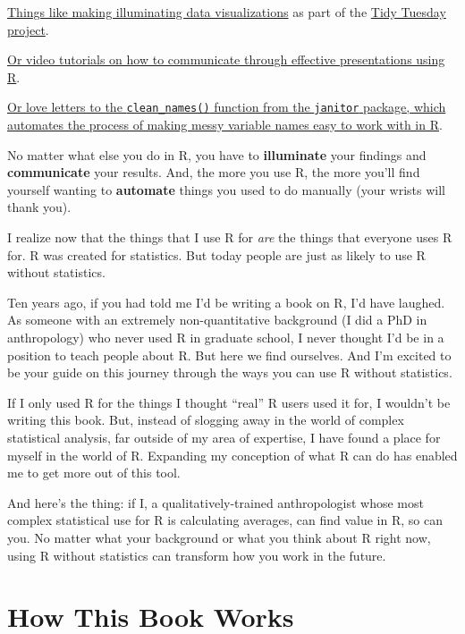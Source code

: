 \documentclass[
]{book}
\begin{document}
\href{https://twitter.com/CedScherer/status/1220843943224578050}{Things like making illuminating data visualizations} as part of the \href{https://github.com/rfordatascience/tidytuesday}{Tidy Tuesday project}.

\href{https://twitter.com/spcanelon/status/1424932510065209348}{Or video tutorials on how to communicate through effective presentations using R}.

\href{https://twitter.com/WeAreRLadies/status/1228049014601342976}{Or love letters to the \texttt{clean\_names()} function from the \texttt{janitor} package, which automates the process of making messy variable names easy to work with in R}.

No matter what else you do in R, you have to \textbf{illuminate} your findings and \textbf{communicate} your results. And, the more you use R, the more you'll find yourself wanting to \textbf{automate} things you used to do manually (your wrists will thank you).

I realize now that the things that I use R for \emph{are} the things that everyone uses R for. R was created for statistics. But today people are just as likely to use R without statistics.

Ten years ago, if you had told me I'd be writing a book on R, I'd have laughed. As someone with an extremely non-quantitative background (I did a PhD in anthropology) who never used R in graduate school, I never thought I'd be in a position to teach people about R. But here we find ourselves. And I'm excited to be your guide on this journey through the ways you can use R without statistics.

If I only used R for the things I thought ``real'' R users used it for, I wouldn't be writing this book. But, instead of slogging away in the world of complex statistical analysis, far outside of my area of expertise, I have found a place for myself in the world of R. Expanding my conception of what R can do has enabled me to get more out of this tool.

And here's the thing: if I, a qualitatively-trained anthropologist whose most complex statistical use for R is calculating averages, can find value in R, so can you. No matter what your background or what you think about R right now, using R without statistics can transform how you work in the future.

\hypertarget{how-this-book-works}{%
\section*{How This Book Works}\label{how-this-book-works}}
\end{document}
